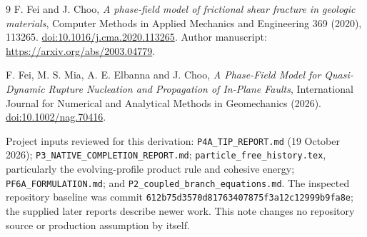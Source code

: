 \documentclass[11pt,a4paper]{article}
\numberwithin{equation}{section}
\begin{document}
\begin{thebibliography}{9}
F. Fei and J. Choo,
\emph{A phase-field model of frictional shear fracture in geologic materials},
Computer Methods in Applied Mechanics and Engineering 369 (2020), 113265.
\href{https://doi.org/10.1016/j.cma.2020.113265}{doi:10.1016/j.cma.2020.113265}.
Author manuscript:
\url{https://arxiv.org/abs/2003.04779}.

F. Fei, M. S. Mia, A. E. Elbanna and J. Choo,
\emph{A Phase-Field Model for Quasi-Dynamic Rupture Nucleation and
Propagation of In-Plane Faults},
International Journal for Numerical and Analytical Methods in Geomechanics
(2026).
\href{https://doi.org/10.1002/nag.70416}{doi:10.1002/nag.70416}.

\raggedright
Project inputs reviewed for this derivation:
\texttt{P4A\_TIP\_REPORT.md} (19 October 2026);
\texttt{P3\_NATIVE\_COMPLETION\_REPORT.md};
\texttt{particle\_free\_history.tex}, particularly the evolving-profile
product rule and cohesive energy;
\texttt{PF6A\_FORMULATION.md}; and
\texttt{P2\_coupled\_branch\_equations.md}.
The inspected repository baseline was commit
\texttt{612b75d3570d81763407875f3a12c12999b9fa8e};
the supplied later reports describe newer work.
This note changes no repository source or production assumption by itself.
\end{thebibliography}
\end{document}
